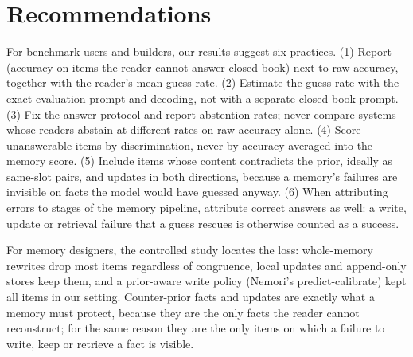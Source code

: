 \section{Recommendations}
\label{sec:discussion}

For benchmark users and builders, our results suggest six practices. (1) Report \cpr{} (accuracy on items the reader
cannot answer closed-book) next to raw accuracy, together with the reader's mean guess rate. (2) Estimate the guess rate
with the exact evaluation prompt and decoding, not with a separate closed-book prompt. (3) Fix the answer protocol and
report abstention rates; never compare systems whose readers abstain at different rates on raw accuracy alone. (4) Score
unanswerable items by discrimination, never by accuracy averaged into the memory score. (5) Include items whose content
contradicts the prior, ideally as same-slot pairs, and updates in both directions, because a memory's failures are
invisible on facts the model would have guessed anyway. (6) When attributing errors to stages of the memory pipeline,
attribute correct answers as well: a write, update or retrieval failure that a guess rescues is otherwise counted as a
success.

For memory designers, the controlled study locates the loss: whole-memory rewrites drop most items regardless of
congruence, local updates and append-only stores keep them, and a prior-aware write policy (Nemori's predict-calibrate)
kept all items in our setting. Counter-prior facts and updates are exactly what a memory must protect, because they are
the only facts the reader cannot reconstruct; for the same reason they are the only items on which a failure to write,
keep or retrieve a fact is visible.
